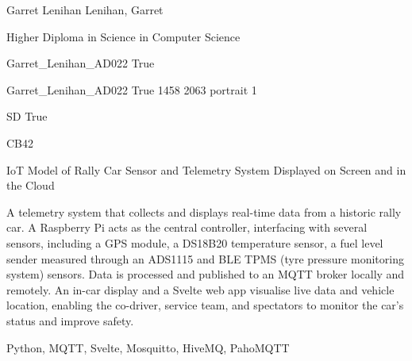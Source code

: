 
\begingroup{}\relax



\def\Key{Garret_Lenihan_AD022}

{Garret Lenihan}
{Lenihan, Garret}

{Higher Diploma in Science in Computer Science}

{Garret_Lenihan_AD022}
{True}

{Garret_Lenihan_AD022}
{True}
{1458}
{2063}
{portrait}
{1}

{SD}
{True}

{CB42}

{IoT Model of Rally Car Sensor and Telemetry System Displayed on Screen and in the Cloud}

{A telemetry system that collects and displays real-time data from a historic rally car. A Raspberry Pi acts as the central controller, interfacing with several sensors, including a GPS module, a DS18B20 temperature sensor, a fuel level sender measured through an ADS1115 and BLE TPMS (tyre pressure monitoring system) sensors. Data is processed and published to an MQTT broker locally and remotely. An in-car display and a Svelte web app visualise live data and vehicle location, enabling the co-driver, service team, and spectators to monitor the car's status and improve safety.}

{Python, MQTT, Svelte, Mosquitto, HiveMQ, PahoMQTT}

